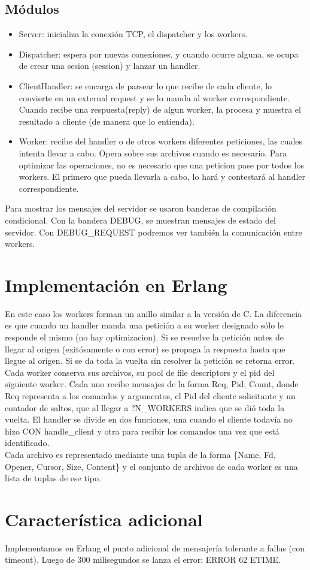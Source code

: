 \documentclass[a4paper,12pt]{article}
\begin{document}
    \subsection*{Módulos\\}
    \begin{itemize}
    \item Server: inicializa la conexión TCP, el dispatcher y los workers.
    \item Dispatcher: espera por nuevas conexiones, y cuando ocurre alguna, se ocupa de crear una sesion (session) y lanzar un handler.
    \item ClientHandler: se encarga de parsear lo que recibe de cada cliente, lo convierte en un external request y se lo manda al worker correspondiente. Cuando recibe una respuesta(reply) de algun worker, la procesa y muestra el resultado a cliente (de manera que lo entienda).
    \item Worker: recibe del handler o de otros workers diferentes peticiones, las cuales intenta llevar a cabo. Opera sobre sus archivos cuando es necesario. Para optimizar las operaciones, no es necesario que una peticion pase por todos los workers. El primero que pueda llevarla a cabo, lo hará y contestará al handler correspondiente.
    \end{itemize}
    Para mostrar los mensajes del servidor se usaron banderas de compilación condicional. Con la bandera DEBUG, se muestran mensajes de estado del servidor. Con DEBUG\_REQUEST podremos ver también la comunicación entre workers.
    
\section*{Implementación en Erlang}
    En este caso los workers forman un anillo similar a la versión de C. La diferencia es que cuando un handler manda una petición a su worker designado sólo le responde el mismo (no hay optimizacion). Si se resuelve la petición antes de llegar al origen (exitósamente o con error) se propaga la respuesta hasta que llegue al origen. Si se da toda la vuelta sin resolver la petición se retorna error. Cada worker conserva sus archivos, su pool de file descriptors y el pid del siguiente worker. Cada uno recibe mensajes de la forma {Req, Pid, Count}, donde Req representa a los comandos y argumentos, el Pid del cliente solicitante y un contador de saltos, que al llegar a ?N\_WORKERS indica que se dió toda la vuelta.
    El handler se divide en dos funciones, una cuando el cliente todavía no hizo CON handle\_client y otra para recibir los comandos una vez que está identificado.\\
    Cada archivo es representado mediante una tupla de la forma \{Name, Fd, Opener, Cursor, Size, Content\} y el conjunto de archivos de cada worker es una lista de tuplas de ese tipo.

\section*{Característica adicional}
    Implementamos en Erlang el punto adicional de mensajería tolerante a fallas (con timeout). Luego de 300 milisegundos se lanza el error: ERROR 62 ETIME. 
\end{document}

